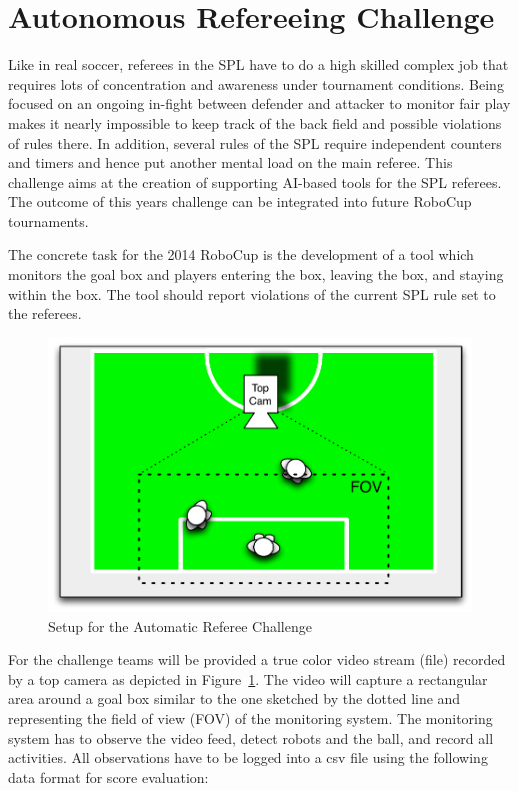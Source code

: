 \documentclass[12pt]{article}
\begin{document}
\newpage






\section{Autonomous Refereeing Challenge}

Like in real soccer, referees in the SPL have to do a high skilled complex job that requires lots of concentration and awareness under tournament conditions. Being focused on an ongoing in-fight between defender and attacker to monitor fair play makes it nearly impossible to keep track of the back field and possible violations of rules there. In addition, several rules of the SPL require independent counters and timers and hence put another mental load on the main referee. This challenge aims at the creation of supporting AI-based tools for the SPL referees. The outcome of this years challenge can be integrated into future RoboCup tournaments.

The concrete task for the 2014 RoboCup is the development of a tool which monitors the goal box and players entering the box, leaving the box, and staying within the box. The tool should report violations of the current SPL rule set to the referees.

\begin{figure}[th!]
\centerline{\includegraphics[width=0.65\columnwidth]{figures/refmon}}
\caption{Setup for the Automatic Referee Challenge}
\label{fig:referee_challenge}
\end{figure}

For the challenge teams will be provided a true color video stream (file) recorded by a top camera as depicted in Figure~\ref{fig:referee_challenge}. The video will capture a rectangular area around a goal box similar to the one sketched by the dotted line and representing the field of view (FOV) of the monitoring system. The monitoring system has to observe the video feed, detect robots and the ball, and record all activities. All observations have to be logged into a csv file using the following data format for score evaluation:
\end{document}
